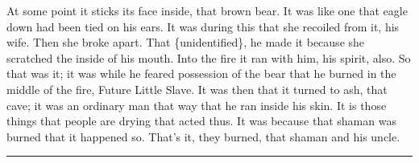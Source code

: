 \begin{pairs}
\begin{Rightside}
At some point it sticks its face inside, that brown bear.
It was like one that eagle down had been tied on his ears.
It was during this that she recoiled from it, his wife.
Then she broke apart.
That \{unidentified\}, he made it because she scratched the inside of his mouth.
Into the fire it ran with him, his spirit, also.
So that was it;
it was while he feared possession of the bear that he burned in the middle of the fire, Future Little Slave.
\pend
\pstart
{}It was then that it turned to ash, that cave;
it was an ordinary man that way that he ran inside his skin.
It is those things that people are drying that acted thus.
It was because that shaman was burned that it happened so.
That’s it, they burned, that shaman and his uncle.
\pend
\endnumbering
\end{Rightside}
\end{pairs}
\Columns

\fancybreak{\rule{16em}{0.125pt}}

